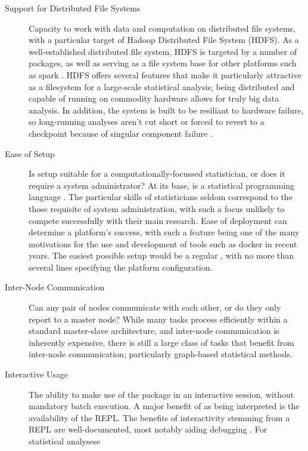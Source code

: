 \begin{description}
  \item[Support for Distributed File Systems]
    Capacity to work with data and computation on distributed file systems,
    with a particular target of Hadoop Distributed File System (HDFS). As a
    well-established distributed file system, HDFS is targeted by a number
    of \R packages, as well as serving as a file system base for other
    platforms such as spark \cite{analytics:_rhadoop_wiki}
    \cite{deltarho:_rhipe}\cite{urbanek20}\cite{zaharia2016apache}. HDFS offers
    several features that make it particularly attractive as a filesystem
    for a large-scale statistical analysis; being distributed and capable of
    running on commodity hardware allows for truly big data analysis. In
    addition, the system is built to be resiliant to hardware failure, so
    long-running analyses aren't cut short or forced to revert to a
    checkpoint because of singular component failure
    \cite{shvachko2010hadoop}.
  \item[Ease of Setup]
    Is setup suitable for a computationally-focussed statistician, or does
    it require a system administrator? At its base, \R is a statistical
    programming language \cite{rcore2020intro}. The particular skills of
    statisticians seldom correspond to the those requisite of system
    administration, with such a focus unlikely to compete successfully with
    their main research. Ease of deployment can determine a platform's
    success, with such a feature being one of the many motivations for the
    use and development of tools such as docker in recent years. The easiest
    possible setup would be a regular
    , with no more than
    several lines specifying the platform configuration.
  \item[Inter-Node Communication]
    Can any pair of nodes communicate with each other, or do they only
    report to a master node? While many tasks process efficiently within a
    standard master-slave architecture, and inter-node communication is
    inherently expensive, there is still a large class of tasks that benefit
    from inter-node communication\cite{walker1996mpi}; particularly
    graph-based statistical methods.
  \item[Interactive Usage]
    The ability to make use of the package in an interactive \R session,
    without mandatory batch execution. A major benefit of \R as being
    interpreted is the availability of the REPL. The benefits of
    interactivity stemming from a REPL are well-documented, most notably
    aiding debugging \cite{mccarthy1978history}. For statistical analysese

\end{description}
